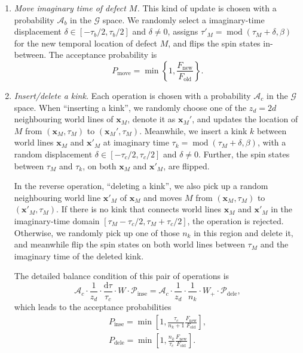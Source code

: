 \documentclass{article}
\DeclareMathOperator{\Mod}{mod}
\theoremstyle{plain} \newtheorem{thm}{Theorem}[section]
\theoremstyle{definition} \newtheorem{df}{Definition}[section]
\theoremstyle{definition} \newtheorem{eg}{Example}
\theoremstyle{remark} \newtheorem*{rmk}{Remark}
\begin{document}
\begin{enumerate}
  \item \textit{Move imaginary time of defect $M$.}
    This kind of update is chosen with a probability $\mathcal{A}_b$ in the $\mathcal{G}$ space. We randomly select a imaginary-time displacement $\delta \in [-\tau_b/2, \tau_b/2]$ and $\delta\ne 0$, assigns $\tau'_M = \Mod(\tau_M+\delta,\beta)$ for the new temporal location of defect $M$, and flips the spin states in-between. The acceptance probability is
    \begin{equation}
      P_\text{move} = \min\left\{1, \frac{F_\text{new}}{F_\text{old}}\right\}.
    \end{equation}

  \item \textit{Insert/delete a kink.}
    Each operation is chosen with a probability $\mathcal{A}_c$ in the $\mathcal{G}$ space. When ``inserting a kink'', we randomly choose one of the $z_d = 2d$ neighbouring world lines of $\bm{x}_M$, denote it as $\bm{x}_M'$, and updates the location of $M$ from $(\bm{x}_M, \tau_M)$ to $(\bm{x}_M', \tau_M)$. Meanwhile, we insert a kink $k$ between world lines ${\mathbf x}_M$ and ${\mathbf x}'_M$ at imaginary time $\tau_k = \Mod(\tau_M+\delta,\beta)$, with a random displacement $\delta \in [-\tau_c/2, \tau_c/2]$ and $\delta\neq 0$. Further, the spin states between $\tau_M$ and $\tau_k$, on both ${\mathbf x}_M$ and ${\mathbf x}'_M$, are flipped.

    In the reverse operation, ``deleting a kink'', we also pick up a random neighbouring world line ${\mathbf x}'_M$ of $\mathbf{x}_M$ and moves $M$ from $({\mathbf x}_M, \tau_M)$ to $({\mathbf x}'_M, \tau_M)$. If there is no kink that connects world lines ${\mathbf x}_M$ and ${\mathbf x}'_M$ in the imaginary-time domain $[\tau_M-\tau_c/2, \tau_M+\tau_c/2]$, the operation is rejected. Otherwise, we randomly pick up one of those  $n_k$ in this region and delete it, and meanwhile flip the spin states on both world lines between $\tau_M$ and the imaginary time of the deleted kink.

    The detailed balance condition of this pair of operations is
    \begin{equation}
      \mathcal{A}_c\cdot\frac{1}{z_d}\cdot\frac{\mathrm{d}\tau}{\tau_c}\cdot W\cdot \mathcal{P}_\text{inse} = \mathcal{A}_c\cdot\frac{1}{z_d}\cdot\frac{1}{n_k}\cdot W_+\cdot \mathcal{P}_\text{dele},
    \end{equation}
    which leads to the acceptance probabilities
    \begin{gather}
      P_\text{inse} = \min\left[1, \frac{\tau_c}{n_k+1}\frac{F_\text{new}}{F_\text{old}}\right],\\
      P_\text{dele} = \min\left[1, \frac{n_k}{\tau_c}\frac{F_\text{new}}{F_\text{old}}\right].
    \end{gather}
\end{enumerate}
\end{document}
